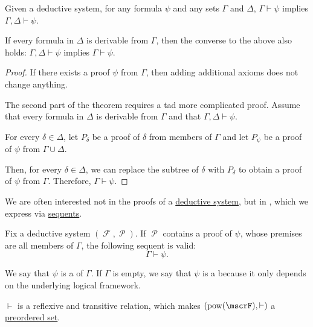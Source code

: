 \begin{proposition}\label{thm:deductive_system_transitivity}
  Given a deductive system, for any formula \( \psi \) and any sets \( \Gamma \) and \( \Delta \), \( \Gamma \vdash \psi \) implies \( \Gamma, \Delta \vdash \psi \).

  If every formula in \( \Delta \) is derivable from \( \Gamma \), then the converse to the above also holds: \( \Gamma, \Delta \vdash \psi \) implies \( \Gamma \vdash \psi \).
\end{proposition}
\begin{proof}
  If there exists a proof \( \psi \) from \( \Gamma \), then adding additional axioms does not change anything.

  The second part of the theorem requires a tad more complicated proof. Assume that every formula in \( \Delta \) is derivable from \( \Gamma \) and that \( \Gamma, \Delta \vdash \psi \).

  For every \( \delta \in \Delta \), let \( P_\delta \) be a proof of \( \delta \) from members of \( \Gamma \) and let \( P_\psi \) be a proof of \( \psi \) from \( \Gamma \cup \Delta \).

  Then, for every \( \delta \in \Delta \), we can replace the subtree of \( \delta \) with \( P_\delta \) to obtain a proof of \( \psi \) from \( \Gamma \). Therefore, \( \Gamma \vdash \psi \).
\end{proof}

\begin{definition}\label{def:proof_derivability}\mimprovised
  We are often interested not in the proofs of a \hyperref[def:deductive_system]{deductive system}, but in , which we express via \hyperref[def:judgment/sequent]{sequents}.

  Fix a deductive system \( (\mscrF, \mscrP) \). If \( \mscrP \) contains a proof of \( \psi \), whose premises are all members of \( \Gamma \), the following sequent is valid:
  \begin{equation*}
    \Gamma \vdash \psi.
  \end{equation*}

  We say that \( \psi \) is a  of \( \Gamma \). If \( \Gamma \) is empty, we say that \( \psi \) is a  because it only depends on the underlying logical framework.
\end{definition}
\begin{comments}
  \item \( \vdash \) is a reflexive and transitive relation, which makes \( (\pow(\mscrF), \vdash) \) a \hyperref[def:preordered_set]{preordered set}.
\end{comments}


